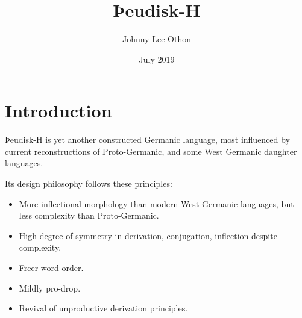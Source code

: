 \documentclass{article}
\title{Þeudisk-H}
\author{Johnny Lee Othon}
\date{July 2019}
\begin{document}
\maketitle

\section{Introduction}

Þeudisk-H is yet another constructed Germanic language, most influenced by current reconstructions of Proto-Germanic, and some West Germanic daughter languages.

Its design philosophy follows these principles:

\begin{itemize}
\item More inflectional morphology than modern West Germanic languages, but less complexity than Proto-Germanic.
\item High degree of symmetry in derivation, conjugation, inflection despite complexity.
\item Freer word order.
\item Mildly pro-drop.
\item Revival of unproductive derivation principles.
\end{itemize}








\end{document}
